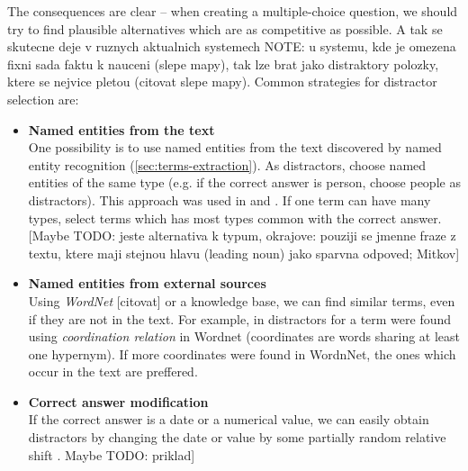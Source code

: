 \documentclass[a4paper, 12pt, twoside]{fithesis2}		%
\renewcommand{\_}{\leavevmode \kern0.07em\vbox{\hrule width0.4em}}
\newcommand{\squarebullet}{\textcolor{black}{\raisebox{0.15em}{\rule{4pt}{4pt}}}}
\newenvironment{myItemize}{
  \begin{itemize}[leftmargin=2em,rightmargin=1em,itemsep=\parskip ,parsep=0em,topsep=0em,partopsep=0em]
  \renewcommand{\labelitemi}{\squarebullet}
  \renewcommand{\labelitemii}{$\diamond$}
}{
  \end{itemize}
}
\newcounter{choice}
\begin{document}
The consequences are clear -- when creating a multiple-choice question, we should try to find plausible alternatives which are as competitive as possible.
A tak se skutecne deje v ruznych aktualnich systemech \cite{question-gen-mitkov, slepe-mapy}
NOTE: u systemu, kde je omezena fixni sada faktu k nauceni (slepe mapy), tak lze brat jako distraktory polozky, ktere se nejvice pletou (citovat slepe mapy). Common strategies for distractor selection are:
\begin{myItemize}
\item \textbf{Named entities from the text}\\
  One possibility is to use named entities from the text discovered by named entity recognition (\autoref{sec:terms-extraction}). As distractors, choose named entities of the same type (e.g. if the correct answer is person, choose people as distractors). This approach was used in \cite{mentor} and \cite{ontoque}. If one term can have many types, select terms which has most types common with the correct answer.
  [Maybe TODO: jeste alternativa k typum, okrajove: pouziji se jmenne fraze z textu, ktere maji stejnou hlavu (leading noun) jako sparvna odpoved; Mitkov]

\item \textbf{Named entities from external sources}\\
  Using \textit{WordNet} [citovat] or a knowledge base, we can find similar terms, even if they are not in the text. For example, in \cite{question-gen-mitkov} distractors for a term were found using \textit{coordination relation} in Wordnet (coordinates are words sharing at least one hypernym). If more coordinates were found in WordnNet, the ones which occur in the text are preffered.

\item \textbf{Correct answer modification}\\
  If the correct answer is a date or a numerical value, we can easily obtain distractors by changing the date or value by some partially random relative shift
\cite{question-gen-domain-ontologies}.
Maybe TODO: priklad]
\end{myItemize}




\end{document}
